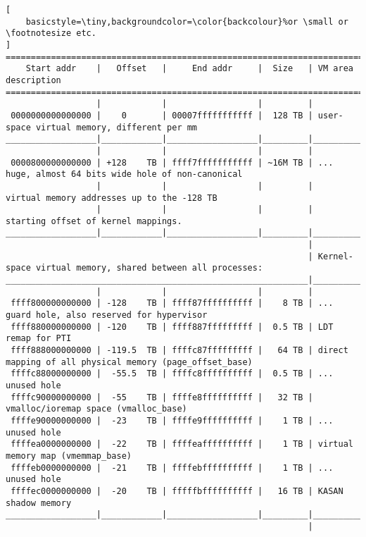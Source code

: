 \documentclass[a4paper,10pt]{article}
\begin{document}
\begin{flushleft}
\begin{lstlisting}[
    basicstyle=\tiny,backgroundcolor=\color{backcolour}%or \small or \footnotesize etc.
]
========================================================================================================================
    Start addr    |   Offset   |     End addr     |  Size   | VM area description
========================================================================================================================
                  |            |                  |         |
 0000000000000000 |    0       | 00007fffffffffff |  128 TB | user-space virtual memory, different per mm
__________________|____________|__________________|_________|___________________________________________________________
                  |            |                  |         |
 0000800000000000 | +128    TB | ffff7fffffffffff | ~16M TB | ... huge, almost 64 bits wide hole of non-canonical
                  |            |                  |         |     virtual memory addresses up to the -128 TB
                  |            |                  |         |     starting offset of kernel mappings.
__________________|____________|__________________|_________|___________________________________________________________
                                                            |
                                                            | Kernel-space virtual memory, shared between all processes:
____________________________________________________________|___________________________________________________________
                  |            |                  |         |
 ffff800000000000 | -128    TB | ffff87ffffffffff |    8 TB | ... guard hole, also reserved for hypervisor
 ffff880000000000 | -120    TB | ffff887fffffffff |  0.5 TB | LDT remap for PTI
 ffff888000000000 | -119.5  TB | ffffc87fffffffff |   64 TB | direct mapping of all physical memory (page_offset_base)
 ffffc88000000000 |  -55.5  TB | ffffc8ffffffffff |  0.5 TB | ... unused hole
 ffffc90000000000 |  -55    TB | ffffe8ffffffffff |   32 TB | vmalloc/ioremap space (vmalloc_base)
 ffffe90000000000 |  -23    TB | ffffe9ffffffffff |    1 TB | ... unused hole
 ffffea0000000000 |  -22    TB | ffffeaffffffffff |    1 TB | virtual memory map (vmemmap_base)
 ffffeb0000000000 |  -21    TB | ffffebffffffffff |    1 TB | ... unused hole
 ffffec0000000000 |  -20    TB | fffffbffffffffff |   16 TB | KASAN shadow memory
__________________|____________|__________________|_________|____________________________________________________________
                                                            |

\end{lstlisting}
\end{flushleft}
\end{document}
